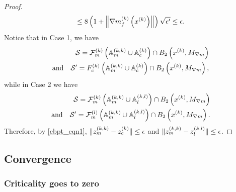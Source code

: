 \begin{proof}
\begin{align*}
\le 8\left(1 + \left\|{\nabla m_f^{(k)}\left(x^{(k)}\right)}\right\|\right) \sqrt{\epsilon'} 
\le \epsilon.
\end{align*}
Notice that in Case 1, we have 
\begin{align*}
\mathcal S  = {\mathcal F_m^{(k)}}\left({\mathbb A_m^{(k, k)}} \cup {\mathbb A_c^{(k)}} \right) \cap B_2\left(x^{(k)}, {M_{\nabla m}}\right) \\ 
\textrm{and} \quad \mathcal S' = {F_c^{(k)}}\left({\mathbb A_m^{(k, k)}} \cup {\mathbb A_c^{(k)}} \right) \cap B_2\left(x^{(k)}, {M_{\nabla m}}\right), 
\end{align*}
while in Case 2 we have 
\begin{align*}
\mathcal S  = {\mathcal F_m^{(k)}}\left({\mathbb A_m^{(k, k)}} \cup {\mathbb A_l^{(k, l)}}\right) \cap B_2\left(x^{(k)}, {M_{\nabla m}}\right) \\
\textrm{and} \quad \mathcal S' = {\mathcal F_m^{(l)}}\left({\mathbb A_m^{(k, k)}} \cup {\mathbb A_l^{(k, l)}} \right) \cap B_2\left(x^{(k)}, {M_{\nabla m}}\right).
\end{align*}
Therefore, by \cref{cbpt_eqn1}, $\|{z_m^{(k, k)}} - {z_c^{(k)}}\| \le \epsilon$ and $\|{z_m^{(k, k)}} - {z_l^{(k, l)}}\| \le \epsilon$.
\end{proof}


\subsection{Convergence}
\label{convergence_section}

\subsubsection{Criticality goes to zero}
\label{limit_of_criticallity_to_zero}




